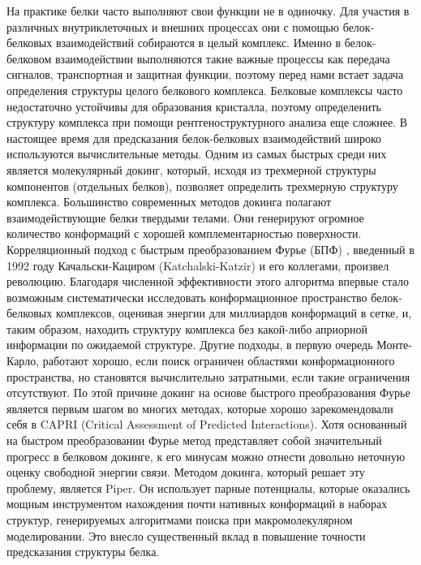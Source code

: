 \documentclass[a4paper,12pt]{article}
\numberwithin{equation}{section}%
\begin{document}
\newline
На практике белки часто выполняют свои функции не в одиночку. Для участия в различных внутриклеточных и внешних процессах они с помощью белок-белковых взаимодействий собираются в целый комплекс. Именно в белок-белковом взаимодействии выполняются такие важные процессы как передача сигналов, транспортная и защитная функции, поэтому перед нами встает задача определения структуры целого белкового комплекса.
\newline
Белковые комплексы часто недостаточно устойчивы для образования кристалла, поэтому определенить структуру комплекса при помощи рентгеноструктурного анализа еще сложнее.
\newline
В настоящее время для предсказания белок-белковых взаимодействий широко используются вычислительные методы. Одним из самых быстрых среди них является молекулярный докинг, который, исходя из трехмерной структуры компонентов (отдельных белков), позволяет определить трехмерную структуру комплекса\cite{s7}\cite{s8}\cite{s9}. 
\newline
Большинство современных методов докинга полагают взаимодействующие белки твердыми телами. Они генерируют огромное количество конформаций с хорошей комплементарностью поверхности. Корреляционный подход с быстрым преобразованием Фурье (БПФ) \cite{s13}, введенный в 1992 году Качальски-Кациром (Katchalski\‐-Katzir) и его коллегами, произвел революцию. Благодаря численной эффективности этого алгоритма впервые стало возможным систематически исследовать конформационное пространство белок-белковых комплексов, оценивая энергии для миллиардов конформаций в сетке, и, таким образом, находить структуру комплекса без какой-либо априорной информации по ожидаемой структуре.  Другие подходы, в первую очередь Монте-Карло, работают хорошо, если поиск ограничен областями конформационного пространства, но становятся вычислительно затратными, если такие ограничения отсутствуют. По этой причине докинг на основе быстрого преобразования Фурье является первым шагом во многих методах, которые хорошо зарекомендовали себя в CAPRI (Critical Assessment of Predicted Interactions).
\newline
Хотя основанный на быстром преобразовании Фурье метод представляет собой значительный прогресс в белковом докинге, к его минусам можно отнести довольно неточную оценку свободной энергии связи.
\newline
Методом докинга, который решает эту проблему, является Piper\cite{s10}. Он использует парные потенциалы, которые оказались мощным инструментом нахождения почти нативных конформаций в наборах структур, генерируемых алгоритмами поиска при макромолекулярном моделировании. Это внесло существенный вклад в повышение точности предсказания структуры белка.
\end{document}
